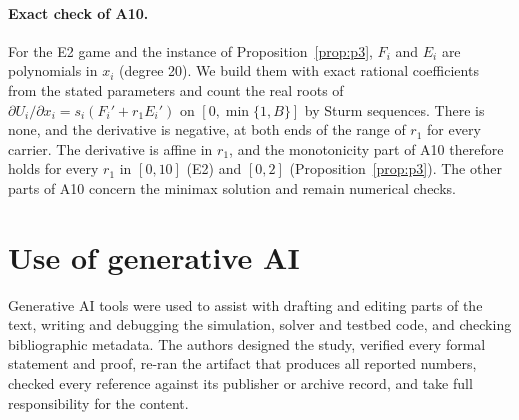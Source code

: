 \documentclass[11pt]{article}
\theoremstyle{definition}
\begin{document}
\paragraph{Exact check of A10.} For the E2 game and the instance of Proposition~\ref{prop:p3}, $F_i$ and $E_i$ are
polynomials in $x_i$ (degree 20). We build them with exact rational coefficients from the stated
parameters and count the real roots of $\partial U_i/\partial x_i=s_i(F_i'+r_1E_i')$ on $[0,\min\{1,B\}]$ by
Sturm sequences. There is none, and the derivative is negative, at both ends of the range of $r_1$ for every
carrier. The derivative is affine in $r_1$, and the monotonicity part of A10 therefore holds for every $r_1$ in
$[0,10]$ (E2) and $[0,2]$ (Proposition~\ref{prop:p3}). The other parts of A10 concern the minimax solution and remain
numerical checks.

\section*{Use of generative AI}

Generative AI tools were used to assist with drafting and editing parts of the text, writing and
debugging the simulation, solver and testbed code, and checking bibliographic metadata. The authors
designed the study, verified every formal statement and proof, re-ran the artifact that produces all
reported numbers, checked every reference against its publisher or archive record, and take full
responsibility for the content.
\end{document}
